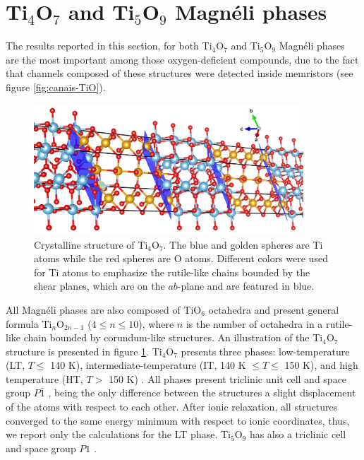 \section{Ti$_4$O$_7$ and Ti$_5$O$_9$ Magnéli phases}
\label{sec:magneli}

The results reported in this section, for both Ti$_4$O$_7$ and Ti$_5$O$_9$ Magnéli phases are the most important among those oxygen-deficient compounds, due to the fact that channels composed of these structures were detected inside memristors (see figure \ref{fig:canais-TiO}). 
\begin{figure}[!ht]
\centering
  \includegraphics[width=0.9\textwidth]{img/ti4o7-multiple-c.jpg}
  \caption{Crystalline structure of Ti$_4$O$_7$. The blue and golden spheres are Ti atoms while the red spheres are O atoms. Different colors were used for Ti atoms to emphasize the rutile-like chains bounded by the shear planes, which are on the $ab$-plane and are featured in blue.}%
  \label{fig:ti4o7-struct}
\end{figure}

All Magnéli phases are also composed of TiO$_6$ octahedra and present general formula Ti$_n$O$_{2n-1}$ ($4 \leq n \leq 10$), where $n$ is the number of octahedra in a rutile-like chain bounded by corundum-like structures. An illustration of the Ti$_4$O$_7$ structure is presented in figure \ref{fig:ti4o7-struct}. Ti$_4$O$_7$ presents three phases: low-temperature (LT, $T \leq$ 140 K), intermediate-temperature (IT, 140 K $\leq T \leq$ 150 K), and high temperature (HT, $T >$ 150 K) \cite{Bartholomew1969}. All phases present triclinic unit cell and space group $P\bar{1}$ \cite{LePage1984,Marezio1973,Marezio1971}, being the only difference between the structures a slight displacement of the atoms with respect to each other. After ionic relaxation, all structures converged to the same energy minimum with respect to ionic coordinates, thus, we report only the calculations for the LT phase. Ti$_5$O$_9$ has also a triclinic cell and space group $P1$ \cite{Andersson1960}.

